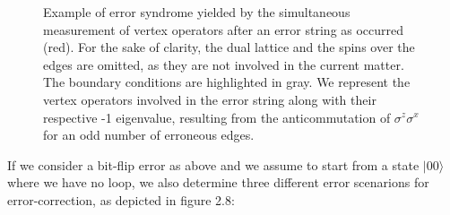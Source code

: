 \documentclass{Configuration_Files/PoliMi3i_thesis}
\begin{document}
\begin{figure}
\begin{center}
	\end{center}
	\caption{Example of error syndrome yielded by the simultaneous measurement of vertex operators after an error string as occurred (red). For the sake of clarity, the dual lattice and the spins over the edges are omitted, as they are not involved in the current matter. The boundary conditions are highlighted in gray. We represent the vertex operators involved in the error string along with their respective -1 eigenvalue, resulting from the anticommutation of $\sigma^z\sigma^x$ for an odd number of erroneous edges.}
	\label{fig:simmes}
\end{figure}



If we consider a bit-flip error as above and we assume to start from a state $|00\rangle$ where we have no loop, we also determine three different error scenarions for error-correction, as depicted in figure 2.8: 
\end{document}
